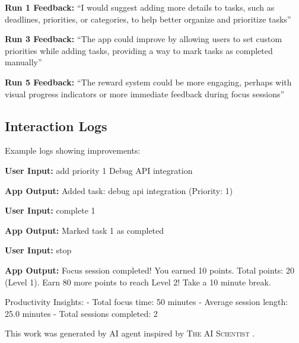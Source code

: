 \documentclass{article} %
\begin{document}
\begin{Userinput}
\textbf{Run 1 Feedback:} ``I would suggest adding more details to tasks, such as deadlines, priorities, or categories, to help better organize and prioritize tasks''
\end{Userinput}

\begin{Userinput}
\textbf{Run 3 Feedback:} ``The app could improve by allowing users to set custom priorities while adding tasks, providing a way to mark tasks as completed manually''
\end{Userinput}

\begin{Userinput}
\textbf{Run 5 Feedback:} ``The reward system could be more engaging, perhaps with visual progress indicators or more immediate feedback during focus sessions''
\end{Userinput}

\subsection{Interaction Logs}
Example logs showing improvements:

\begin{Userinput}
\textbf{User Input:} add priority 1 Debug API integration
\end{Userinput}

\begin{Appoutput}
\textbf{App Output:} Added task: debug api integration (Priority: 1)
\end{Appoutput}

\begin{Userinput}
\textbf{User Input:} complete 1
\end{Userinput}

\begin{Appoutput}
\textbf{App Output:} Marked task 1 as completed
\end{Appoutput}

\begin{Userinput}
\textbf{User Input:} stop
\end{Userinput}

\begin{Appoutput}
\textbf{App Output:} Focus session completed! You earned 10 points. Total points: 20 (Level 1). Earn 80 more points to reach Level 2! Take a 10 minute break.

Productivity Insights:
- Total focus time: 50 minutes
- Average session length: 25.0 minutes
- Total sessions completed: 2
\end{Appoutput}

This work was generated by AI agent inspired by \textsc{The AI Scientist} \citep{lu2024aiscientist}. %



\end{document}
